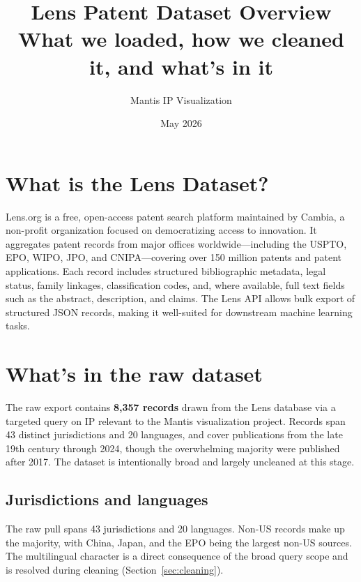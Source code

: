 \documentclass[11pt]{article}
\title{Lens Patent Dataset Overview\\
\large What we loaded, how we cleaned it, and what's in it}
\author{Mantis IP Visualization}
\date{May 2026}
\begin{document}
\maketitle
\tableofcontents
\newpage

\section{What is the Lens Dataset?}

Lens.org is a free, open-access patent search platform maintained by Cambia, a non-profit
organization focused on democratizing access to innovation. It aggregates patent records from
major offices worldwide—including the USPTO, EPO, WIPO, JPO, and CNIPA—covering over
150 million patents and patent applications. Each record includes structured bibliographic
metadata, legal status, family linkages, classification codes, and, where available, full text
fields such as the abstract, description, and claims. The Lens API allows bulk export of
structured JSON records, making it well-suited for downstream machine learning tasks.

\section{What's in the raw dataset}

The raw export contains \textbf{8,357 records} drawn from the Lens database via a targeted
query on IP relevant to the Mantis visualization project. Records span 43 distinct
jurisdictions and 20 languages, and cover publications from the late 19th century through
2024, though the overwhelming majority were published after 2017. The dataset is intentionally
broad and largely uncleaned at this stage.

\subsection{Jurisdictions and languages}

The raw pull spans 43 jurisdictions and 20 languages. Non-US records make up the majority,
with China, Japan, and the EPO being the largest non-US sources. The multilingual character
is a direct consequence of the broad query scope and is resolved during cleaning
(Section~\ref{sec:cleaning}).
\end{document}
